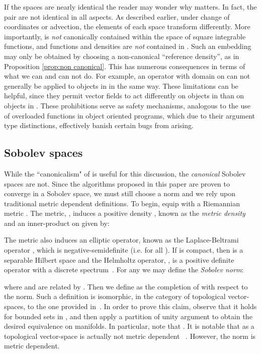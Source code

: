 \documentclass[final,leqno]{amsart}
\begin{document}
If the spaces are nearly identical the reader may wonder why  matters.
In fact, the pair are not identical in all aspects.
As described earlier, under change of coordinates or advection, the elements of each space transform differently.
More importantly,  is \emph{not} canonically contained within the space of square integrable functions, and functions and densities are \emph{not} contained in .
Such an embedding may only be obtained by choosing a non-canonical ``reference density'', as in Proposition \ref{prop:non canonical}.
This has numerous consequences in terms of what we can and can not do.
For example, an operator with domain on  can not generally be applied to objects in  in the same way.
These limitations can be helpful, since they permit vector fields to act differently on objects in  than on objects in .
These prohibitions serve as safety mechanisms, analogous to the use of overloaded functions in object oriented programs, which due to their argument type distinctions, effectively banish certain bugs from arising.



\subsection{Sobolev spaces}
\label{sec:Sobolev spaces}



While the ``canonicalism" of  is useful for this discussion, the \emph{canonical} Sobolev spaces are not.
Since the algorithms proposed in this paper are proven to converge in a Sobolev space, we must still choose a norm and we rely upon traditional metric dependent definitions.  
To begin, equip  with a Riemannian metric .
The metric, , induces a positive density , known as the \emph{metric density} and an inner-product on 
given by:

The metric also induces an elliptic operator, known as the Laplace-Beltrami operator , which is negative-semidefinite (i.e.  for all ).
If  is compact, then  is a separable Hilbert space and the Helmholtz operator, , is a positive definite operator with a discrete spectrum~\cite{Taylor1974}.
For any  we may define the \emph{Sobolev norm}:

where  and  are related by .
Then  we define  as the completion of  with respect to the  norm.  
Such a definition is isomorphic, in the category of topological vector-spaces, to the one provided in~\cite{Hebey1999}.
In order to prove this claim, observe that it holds for bounded sets in , and then apply a partition of unity argument to obtain the desired equivalence on manifolds.
In particular, note that .  It is notable that  as a topological vector-space is actually not metric dependent ~\cite[Proposition 2.2]{Hebey1999}.
However, the norm  is metric dependent.
\end{document}
